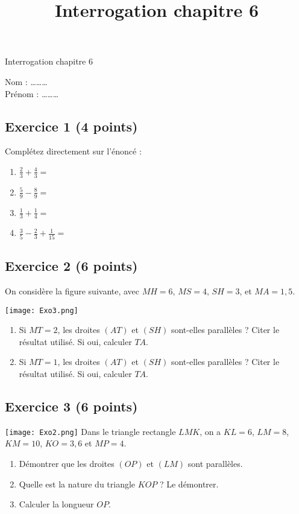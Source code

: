 \documentclass[14 pt]{extarticle}
\title{Interrogation chapitre 6}
\date{}
\theoremstyle{plain}
\begin{document}
\begin{center}{\Large Interrogation chapitre 6}\\ 
 \end{center}
 Nom : \ldots\ldots\ldots\\
 Prénom : \ldots\ldots\ldots
 
 \subsection*{Exercice 1 (4 points)}
 Complétez directement sur l'énoncé : 
 
 \begin{enumerate}
 \item $\frac23 + \frac43 =  $ 
 \item $\frac59 - \frac89=  $ 
 \item $\frac13 + \frac14 =  $
 \item $\frac35 - \frac23 +  \frac1{15} =  $
 \end{enumerate}
 
\subsection*{Exercice 2 (6 points)} 
 
On considère la figure suivante, avec $MH = 6$, $MS= 4$, $SH = 3$, et $MA = 1,5$. 

 \texttt{[image: Exo3.png]}\newline
\begin{enumerate}
\item Si $MT= 2$, les droites $(AT)$ et $(SH)$ sont-elles parallèles ?
Citer le résultat utilisé. Si oui, calculer $TA$. 
\item Si $MT= 1$, les droites $(AT)$ et $(SH)$ sont-elles parallèles ?
Citer le résultat utilisé. Si oui, calculer $TA$.  
\end{enumerate}
 
 \subsection*{Exercice 3 (6 points)}
 
 \texttt{[image: Exo2.png]}\newline
Dans le triangle rectangle $LMK$, on a $KL = 6$, $LM= 8$, $KM=10$, $KO= 3,6$ et $MP= 4$. \begin{enumerate}
\item 
 Démontrer que les droites $(OP)$ et $(LM)$ sont parallèles.
 \item Quelle est la nature du triangle $KOP$ ? Le démontrer.
 \item 
 Calculer la longueur $OP$. 
\end{enumerate}
\end{document}
